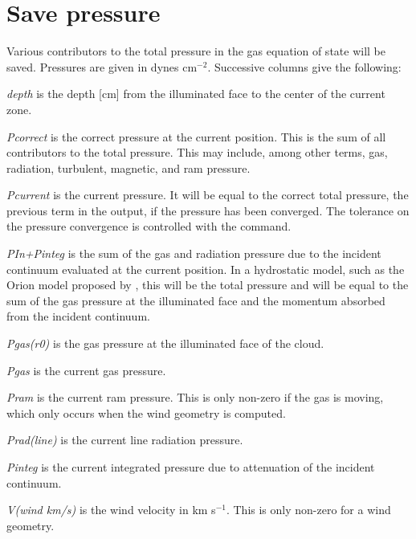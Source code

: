 \section{Save pressure}

Various contributors to the total pressure in the gas equation of state
will be saved.  Pressures are given in dynes cm$^{-2}$.
Successive columns give the following:
\begin{description}
\item \emph{depth} is the depth [cm] from the illuminated face to the center of the
current zone.

\item \emph{Pcorrect} is the correct pressure at the current position.  This is the
sum of all contributors to the total pressure.  This may include, among
other terms, gas, radiation, turbulent, magnetic, and ram pressure.

\item \emph{Pcurrent} is the current pressure.  It will be equal to the correct total
pressure, the previous term in the output, if the pressure has been
converged.  The tolerance on the pressure convergence is controlled with
the  command.

\item  \emph{PIn+Pinteg} is the sum of the gas and radiation pressure due to the
incident continuum evaluated at the current position.  In a hydrostatic
model, such as the Orion model proposed by \citet{Baldwin1991}, this will
be the total pressure and will be equal to the sum of the gas pressure at
the illuminated face and the momentum absorbed from the incident continuum.

\item \emph{Pgas(r0)} is the gas pressure at the illuminated face of the cloud.

\item \emph{Pgas} is the current gas pressure.

\item \emph{Pram} is the current ram pressure.  This is only non-zero if the gas is
moving, which only occurs when the wind geometry is computed.

\item \emph{Prad(line)} is the current line radiation pressure.

\item \emph{Pinteg} is the current integrated pressure due to attenuation of the
incident continuum.

\item \emph{V(wind km/s)} is the wind velocity in km s$^{-1}$.  This is only non-zero for
a wind geometry.


\end{description}
